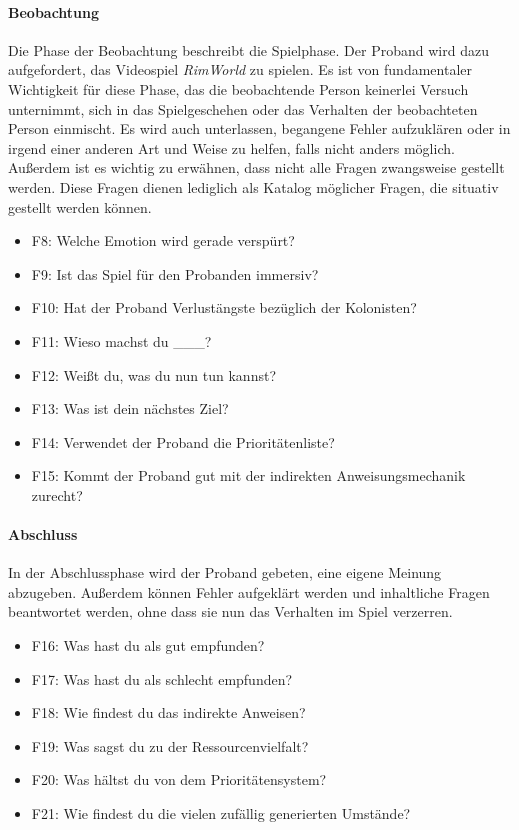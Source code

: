 \paragraph{Beobachtung}
Die Phase der Beobachtung beschreibt die Spielphase. Der Proband wird dazu aufgefordert, das Videospiel \textit{RimWorld} zu spielen. Es ist von fundamentaler Wichtigkeit für diese Phase, das die beobachtende Person keinerlei Versuch unternimmt, sich in das Spielgeschehen oder das Verhalten der beobachteten Person einmischt. Es wird auch unterlassen, begangene Fehler aufzuklären oder in irgend einer anderen Art und Weise zu helfen, falls nicht anders möglich. Außerdem ist es wichtig zu erwähnen, dass nicht alle Fragen zwangsweise gestellt werden. Diese Fragen dienen lediglich als Katalog möglicher Fragen, die situativ gestellt werden können.

\begin{itemize}
    \item F8: Welche Emotion wird gerade verspürt?
    \item F9: Ist das Spiel für den Probanden immersiv?
    \item F10: Hat der Proband Verlustängste bezüglich der Kolonisten?
    \item F11: Wieso machst du \_\_\_?
    \item F12: Weißt du, was du nun tun kannst?
    \item F13: Was ist dein nächstes Ziel?
    \item F14: Verwendet der Proband die Prioritätenliste?
    \item F15: Kommt der Proband gut mit der indirekten Anweisungsmechanik zurecht?
\end{itemize}

\paragraph{Abschluss}
In der Abschlussphase wird der Proband gebeten, eine eigene Meinung abzugeben. Außerdem können Fehler aufgeklärt werden und inhaltliche Fragen beantwortet werden, ohne dass sie nun das Verhalten im Spiel verzerren.

\begin{itemize}
    \item F16: Was hast du als gut empfunden?
    \item F17: Was hast du als schlecht empfunden?
    \item F18: Wie findest du das indirekte Anweisen?
    \item F19: Was sagst du zu der Ressourcenvielfalt?
    \item F20: Was hältst du von dem Prioritätensystem?
    \item F21: Wie findest du die vielen zufällig generierten Umstände?
\end{itemize}

